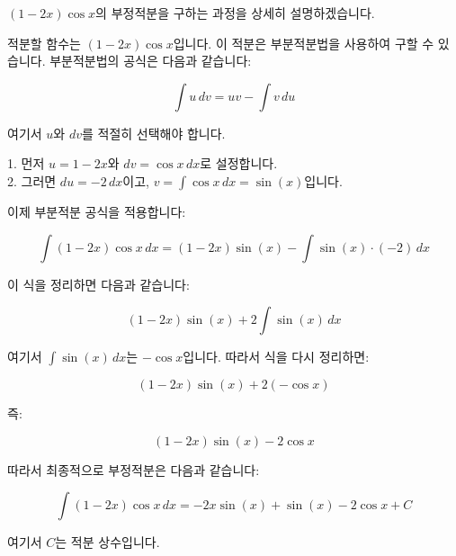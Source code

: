 \documentclass{article}
\begin{document}
\((1 - 2x) \cos x\)의 부정적분을 구하는 과정을 상세히 설명하겠습니다.

적분할 함수는 \((1 - 2x) \cos x\)입니다. 이 적분은 부분적분법을 사용하여 구할 수 있습니다. 부분적분법의 공식은 다음과 같습니다:

\[ \int u \, dv = uv - \int v \, du \]

여기서 \( u \)와 \( dv \)를 적절히 선택해야 합니다.

1. 먼저 \( u = 1 - 2x \)와 \( dv = \cos x \, dx \)로 설정합니다.\\
2. 그러면 \( du = -2 \, dx \)이고, \( v = \int \cos x \, dx = \sin(x) \)입니다.

이제 부분적분 공식을 적용합니다:

\[ \int (1 - 2x) \cos x \, dx = (1 - 2x) \sin(x) - \int \sin(x) \cdot (-2) \, dx \]

이 식을 정리하면 다음과 같습니다:

\[ (1 - 2x) \sin(x) + 2 \int \sin(x) \, dx \]

여기서 \( \int \sin(x) \, dx \)는 \(-\cos x\)입니다. 따라서 식을 다시 정리하면:

\[ (1 - 2x) \sin(x) + 2 (-\cos x) \]

즉:

\[ (1 - 2x) \sin(x) - 2 \cos x \]

따라서 최종적으로 부정적분은 다음과 같습니다:

\[ \int (1 - 2x) \cos x \, dx = -2x \sin(x) + \sin(x) - 2 \cos x + C \]

여기서 \( C \)는 적분 상수입니다.
\end{document}
